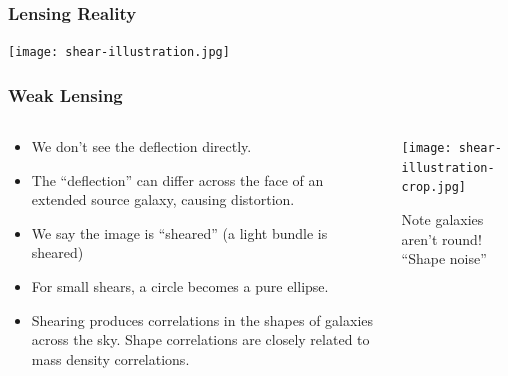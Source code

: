 \documentclass{beamer}
\begin{document}
\frame
{
    \frametitle{Lensing Reality}

    \begin{center}
        \texttt{[image: shear-illustration.jpg]}
        \newline
    \end{center}

}


\frame
{

    \frametitle{Weak Lensing}

    \fontsize{10}{0.8\baselineskip}

    \begin{columns}

        \begin{column}{0.5\textwidth}

            \begin{itemize}

                \item We don't see the deflection directly.

                \item The ``deflection'' can differ across the face of an
                    extended source galaxy, causing distortion.

                \item We say the image is ``sheared'' (a light bundle 
                    is sheared)

                \item For small shears, a circle becomes a pure ellipse.

                \item Shearing produces correlations in the shapes of galaxies across the sky.
                    Shape correlations are closely related to mass density
                    correlations.

            \end{itemize}
        \end{column}
        \begin{column}{0.5\textwidth}
            \texttt{[image: shear-illustration-crop.jpg]}
            \newline
            \begin{center}
                {\small Note galaxies aren't round!  ``Shape noise''}
            \end{center}
        \end{column}
    \end{columns}
}
\end{document}
